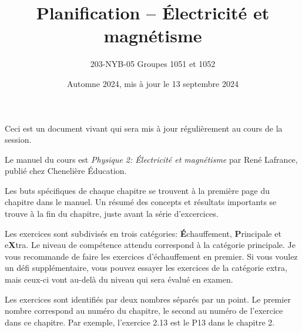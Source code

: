 \documentclass[10pt]{article}
\title{Planification -- Électricité et magnétisme}
\author{203-NYB-05  Groupes 1051 et 1052}
\date{Automne 2024, mis à jour le 13 septembre 2024}
\begin{document}
\makeatletter
\begin{center}
  {\LARGE \noindent\@title}
  \vspace{0.6em}

  {\large \noindent\@author}
  \vspace{0.2em}

  {\large \noindent\@date}
\end{center}
\vspace{2em}
\makeatother

\noindent Ceci est un document vivant qui sera mis à jour régulièrement au cours de la
session.

\vspace{1em}

\noindent Le manuel du cours est \emph{Physique 2: Électricité et magnétisme} par René
Lafrance, publié chez Chenelière Éducation.

\vspace{1em}

\noindent Les buts spécifiques de chaque chapitre se trouvent à la première
page du chapitre dans le manuel. Un résumé des concepts et résultats importants
se trouve à la fin du chapitre, juste avant la série d'excercices.

\vspace{1em}

\noindent Les exercices sont subdivisés en trois catégories:
\textbf{É}chauffement, \textbf{P}rincipale et e\textbf{X}tra. Le niveau de
compétence attendu correspond à la catégorie principale. Je vous recommande de
faire les exercices d'échauffement en premier. Si vous voulez un défi
supplémentaire, vous pouvez essayer les exercices de la catégorie extra, mais
ceux-ci vont au-delà du niveau qui sera évalué en examen.

\vspace{1em}

\noindent Les exercices sont identifiés par deux nombres séparés par un point.
Le premier nombre correspond au numéro du chapitre, le second au numéro de
l'exercice dans ce chapitre. Par exemple, l'exercice 2.13 est le P13 dans le
chapitre 2.
\end{document}
